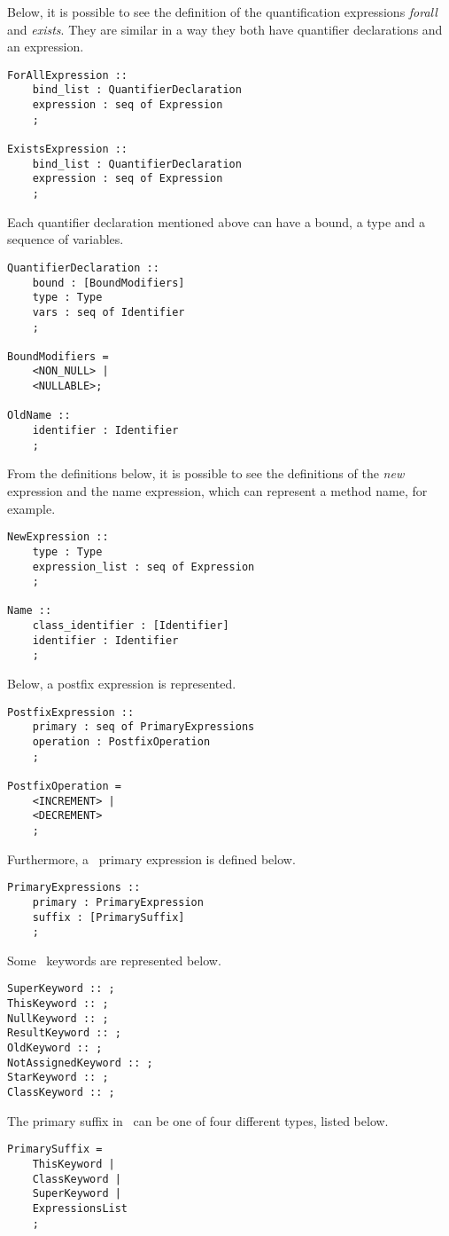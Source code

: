 \medskip
Below, it is possible to see the definition of the quantification expressions \textit{forall} and \textit{exists}. They are similar in a way they both have quantifier declarations and an expression.
\medskip
\begin{lstlisting}
ForAllExpression ::
	bind_list : QuantifierDeclaration
	expression : seq of Expression
	;
	
ExistsExpression ::
	bind_list : QuantifierDeclaration
	expression : seq of Expression
	;
\end{lstlisting}
\medskip
Each quantifier declaration mentioned above can have a bound, a type and a sequence of variables.
\medskip
\begin{lstlisting}	
QuantifierDeclaration ::
	bound : [BoundModifiers]
	type : Type
	vars : seq of Identifier
	;
	
BoundModifiers =
	<NON_NULL> |
	<NULLABLE>;
	
OldName ::
	identifier : Identifier
	;
\end{lstlisting}
\medskip
From the definitions below, it is possible to see the definitions of the \textit{new} expression and the name expression, which can represent a method name, for example.
\medskip
\begin{lstlisting}	
NewExpression ::
	type : Type
	expression_list : seq of Expression
	;
	
Name ::
	class_identifier : [Identifier]
	identifier : Identifier
	;
\end{lstlisting}
\medskip
Below, a postfix expression is represented.
\medskip
\begin{lstlisting}
PostfixExpression :: 
	primary : seq of PrimaryExpressions
	operation : PostfixOperation	
	;

PostfixOperation =
	<INCREMENT> |
	<DECREMENT>
	;
\end{lstlisting}
\medskip
Furthermore, a \jml\ primary expression is defined below.
\medskip
\begin{lstlisting}
PrimaryExpressions ::
	primary : PrimaryExpression
	suffix : [PrimarySuffix]
	;
\end{lstlisting}
\medskip
Some \jml\ keywords are represented below.
\medskip
\begin{lstlisting}
SuperKeyword :: ;
ThisKeyword :: ;
NullKeyword :: ;
ResultKeyword :: ;
OldKeyword :: ;
NotAssignedKeyword :: ;
StarKeyword :: ;
ClassKeyword :: ;
\end{lstlisting}
\medskip
The primary suffix in \jml\ can be one of four different types, listed below.
\medskip
\begin{lstlisting}
PrimarySuffix =
	ThisKeyword |
	ClassKeyword |
	SuperKeyword |
	ExpressionsList
	;
\end{lstlisting}

